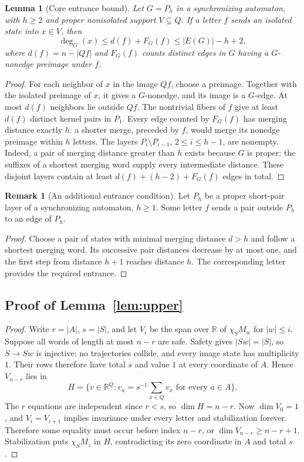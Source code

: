 \documentclass[11pt]{article}
\newtheorem{lemma}[theorem]{Lemma}
\theoremstyle{definition}
\newtheorem{remark}[theorem]{Remark}
\theoremstyle{plain}
\begin{document}
\begin{lemma}[Core entrance bound]\label{lem:entrance-bound}
Let $G=P_h$ in a synchronizing automaton, with $h\ge2$ and proper nonisolated
support $V\subsetneq Q$. If a letter $f$ sends an
isolated state into $x\in V$, then
\[
 \deg_G(x)\le d(f)+F_G(f)\le |E(G)|-h+2,
\]
where $d(f)=n-|Qf|$ and $F_G(f)$ counts distinct edges in $G$ having a
$G$-nonedge preimage under $f$.
\end{lemma}
\begin{proof}
For each neighbor of $x$ in the image $Qf$, choose a
preimage. Together with the isolated preimage of $x$,
it gives a $G$-nonedge, and its image is a $G$-edge.
At most $d(f)$ neighbors lie outside $Qf$.
The nontrivial fibers of $f$ give at least $d(f)$ distinct
kernel pairs in $P_1$. Every edge counted by $F_G(f)$ has
merging distance exactly $h$: a shorter merge, preceded by $f$,
would merge its nonedge preimage within $h$ letters.
The layers $P_i\setminus P_{i-1}$, $2\le i\le h-1$,
are nonempty. Indeed, a pair of merging distance greater than $h$
exists because $G$ is proper; the suffixes of a shortest merging
word supply every intermediate distance. These disjoint layers
contain at least $d(f)+(h-2)+F_G(f)$ edges in total.
\end{proof}

\begin{remark}[An additional entrance condition]\label{lem:pair-entrance}
Let $P_h$ be a proper short-pair layer of a synchronizing
automaton, $h\ge1$. Some letter $f$ sends a
pair outside $P_h$ to an edge of $P_h$.
\end{remark}
\begin{proof}
Choose a pair of states with minimal merging distance
$d>h$ and follow a shortest merging word.
Its successive pair distances decrease by at most
one, and the first step from distance $h+1$ reaches
distance $h$. The corresponding letter
provides the required entrance.
\end{proof}
\subsection*{Proof of Lemma~\ref{lem:upper}}
\begin{proof}
Write $r=|A|$, $s=|S|$, and let $V_i$ be the span over $\mathbb R$ of $\chi_SM_w$ for $|w|\le i$. Suppose all words of length at most $n-r$ are safe. Safety gives $|Sw|=|S|$, so $S\to Sw$ is injective: no trajectories collide, and every image state has multiplicity $1$. Their rows therefore have total $s$ and value $1$ at every coordinate of $A$. Hence $V_{n-r}$ lies in
\[
 H=\{v\in\mathbb R^Q:v_a=s^{-1}\textstyle\sum_{x\in Q}v_x\text{ for every }a\in A\}.
\]
The $r$ equations are independent since $r<s$, so $\dim H=n-r$. Now $\dim V_0=1$, and $V_i=V_{i+1}$ implies invariance under every letter and stabilization forever. Therefore some equality must occur before index $n-r$, or $\dim V_{n-r}\ge n-r+1$. Stabilization puts $\chi_SM_z$ in $H$, contradicting its zero coordinate in $A$ and total $s$.
\end{proof}
\end{document}
